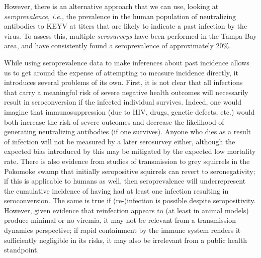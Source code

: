 \documentclass[12pt]{article}
\newcommand{\ie}{\textit{i.e.}}
\newcommand{\cjh}{\textcolor{blue}{cjh}}
\newcommand{\msg}[3]{(#1 $\rightarrow$ #2: #3)}
\newcommand{\mcc}[1]{\msg\cjh\cjh{#1}}
\begin{document}
        However, there is an alternative approach that we can use, looking at \textit{seroprevalence}, \ie, the prevalence in the human population of neutralizing antibodies to KEYV at titers that are likely to indicate a past infection by the virus. To assess this, multiple \textit{serosurveys} have been performed in the Tampa Bay area, and have consistently found a seroprevalence of approximately 20\%\cite{parkin1972review}.%


        While using seroprevalence data to make inferences about past incidence allows us to get around the expense of attempting to measure incidence directly, it introduces several problems of its own. First, it is not clear that all infections that carry a meaningful risk of severe negative health outcomes will necessarily result in seroconversion if the infected individual survives. Indeed, one would imagine that immunosuppression (due to HIV, drugs, genetic defects, etc.) would both increase the risk of severe outcomes and decrease the likelihood of generating neutralizing antibodies (if one survives). Anyone who dies as a result of infection will not be measured by a later serosurvey either, although the expected bias introduced by this may be mitigated by the expected low mortality rate. There is also evidence from studies of transmission to grey squirrels in the Pokomoke swamp\cite{watts1988maintenance} that initially seropositive squirrels can revert to seronegativity; if this is applicable to humans as well, then seroprevalence will underrepresent the cumulative incidence of having had at least one infection resulting in seroconversion. The same is true if (re-)infection is possible despite seropositivity. However, given evidence that reinfection appears to (at least in animal models) produce minimal or no viremia\cite{watts1988maintenance,watts1979experimental}, it may not be relevant from a transmission dynamics perspective; if rapid containment by the immune system renders it sufficiently negligible in its risks, it may also be irrelevant from a public health standpoint. 
\end{document}
